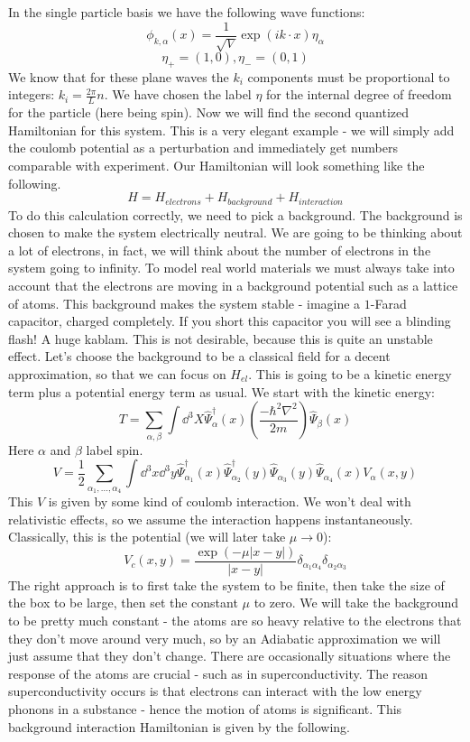 \documentclass{article}
\begin{document}
In the single particle basis we have the following wave functions:
\[\phi_{k,\alpha}(x)=\frac{1}{\sqrt{V}}\exp\left(ik\cdot x\right)\eta_\alpha\]
\[\eta_+ = (1,0), \eta_-=(0,1)\]
We know that for these plane waves the $k_i$ components must be proportional to integers: $k_i =\frac{2\pi}{L}n$. We have chosen the label $\eta$ for the internal degree of freedom for the particle (here being spin). Now we will find the second quantized Hamiltonian for this system. This is a very elegant example - we will simply add the coulomb potential as a perturbation and immediately get numbers comparable with experiment. Our Hamiltonian will look something like the following.
\begin{equation}
    H = H_{electrons}+H_{background}+H_{interaction}
\end{equation}
To do this calculation correctly, we need to pick a background. The background is chosen to make the system electrically neutral. We are going to be thinking about a lot of electrons, in fact, we will think about the number of electrons in the system going to infinity. To model real world materials we must always take into account that the electrons are moving in a background potential such as a lattice of atoms. This background makes the system stable - imagine a $1$-Farad capacitor, charged completely. If you short this capacitor you will see a blinding flash! A huge kablam. This is not desirable, because this is quite an unstable effect. Let's choose the background to be a classical field for a decent approximation, so that we can focus on $H_{el}$. This is going to be a kinetic energy term plus a potential energy term as usual. We start with the kinetic energy:
\[T = \sum_{\alpha, \beta}\int \dd^3 X \hat\Psi^\dagger_\alpha(x)\left(\frac{-\hbar^2\nabla^2}{2m}\right)\hat\Psi_\beta(x)\]
Here $\alpha$ and $\beta$ label spin.
\[V = \frac{1}{2}\sum_{\alpha_1,...,\alpha_4}\int \dd^3 x\dd^3 y \hat\Psi_{\alpha_1}^\dagger(x)\hat\Psi_{\alpha_2}^\dagger(y)\hat\Psi_{\alpha_3}(y)\hat\Psi_{\alpha_4}(x)V_{\alpha}(x,y)\]
This $V$ is given by some kind of coulomb interaction. We won't deal with relativistic effects, so we assume the interaction happens instantaneously. Classically, this is the potential (we will later take $\mu \to 0$):
\[V_c(x,y)=\frac{\exp(-\mu|x-y|)}{|x-y|}\delta_{\alpha_1\alpha_4}\delta_{\alpha_2\alpha_3}\]
The right approach is to first take the system to be finite, then take the size of the box to be large, then set the constant $\mu$ to zero. We will take the background to be pretty much constant - the atoms are so heavy relative to the electrons that they don't move around very much, so by an Adiabatic approximation we will just assume that they don't change. There are occasionally situations where the response of the atoms are crucial - such as in superconductivity. The reason superconductivity occurs is that electrons can interact with the low energy phonons in a substance - hence the motion of atoms is significant. This background interaction Hamiltonian is given by the following.
\end{document}

